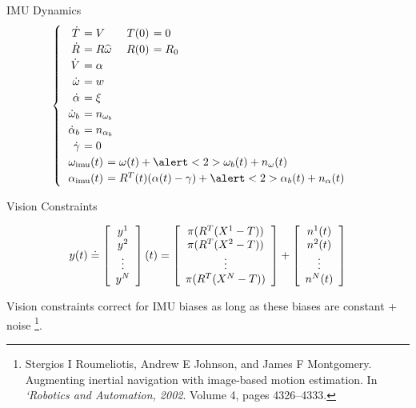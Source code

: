 \begin{tframe}{IMU Dynamics}
\begin{equation}
\begin{cases}
\begin{tabular}{>{$}r<{$} >{$\!\!\!\!\!}l<{$} >{$}r<{$} >{$\!\!\!\!\!}l<{$}}
\dot T &= V & T(0) &= 0 \\
\dot R &= R \widehat \w & R(0) &= R_0\\
\dot V &= \alpha \\ %
\dot \w &= w\\ %
\dot \alpha &= \xi \\%
\dot \w_b &= n_{\w_b}  \\
\dot \alpha_b &= n_{\alpha_b}  \\ 
\dot \gamma &= 0 \\
\end{tabular}\\
\begin{tabular}{>{$}r<{$} >{$\!\!\!\!\!}l<{$}}
\w\imu (t) &= \w(t) + \alert<2>{\w_b(t)} + n_{\w}(t) \\ 
\alpha\imu (t) &= R^T(t) (\alpha(t)- \gamma) + \alert<2>{\alpha_b(t)} + n_{\alpha}(t) 
\end{tabular}
\end{cases}
\end{equation}
\end{tframe}
 
\begin{tframe}{Vision Constraints}

\bigskip
\begin{equation*}
y(t) \doteq \ba{c}
y^1 \\ y^2 \\ \vdots \\ y^N \ea (t)
 = \ba{c}
\pi(R^T(X^1 - T)) \\
\pi(R^T(X^2- T)) \\
\vdots\\
\pi(R^T( X^N- T))
\ea
+ \ba{c}
n^1(t) \\ n^2(t) \\ \vdots \\ n^N(t) \ea 
\end{equation*}

\bigskip
Vision constraints correct for IMU biases as long as these biases are constant + noise
\footnote{Stergios I Roumeliotis, Andrew E Johnson, and James F Montgomery. 
Augmenting inertial navigation with image-based motion estimation. In \emph{`Robotics
and Automation, 2002}. Volume 4, pages 4326–4333.}.
\end{tframe}

